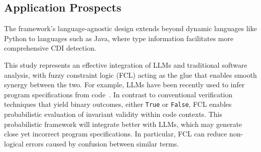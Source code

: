 \subsection{Application Prospects}

The framework's language-agnostic design extends beyond dynamic languages like Python to languages such as Java, where type information facilitates more comprehensive CDI detection.

This study represents an effective integration of LLMs and traditional software analysis, with fuzzy constraint logic (FCL) acting as the glue that enables smooth synergy between the two.  For example, LLMs have
  been recently used to infer program specifications from code~\cite{Ma2025SAG}.
  In contrast to conventional verification techniques that yield binary outcomes, either
  \texttt{True} or \texttt{False}, FCL enables probabilistic evaluation of
  invariant validity within code contexts.
  This probabilistic framework will integrate better with LLMs, which may generate close yet
  incorrect program specifications. In particular, FCL can reduce non-logical
  errors caused by confusion between similar terms.

  
